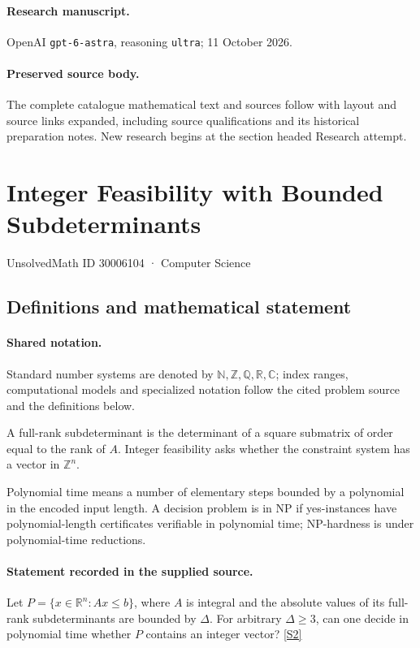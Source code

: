 \documentclass[11pt]{article}
\begin{document}
\paragraph{Research manuscript.} OpenAI \texttt{gpt-6-astra}, reasoning \texttt{ultra}; 11 October 2026.
\paragraph{Preserved source body.} The complete catalogue mathematical text and sources follow with layout and source links expanded, including source qualifications and its historical preparation notes. New research begins at the section headed Research attempt.

\section{Integer Feasibility with Bounded Subdeterminants}\label{30006104}
{\small UnsolvedMath ID 30006104 · Computer Science}
\subsection{Definitions and mathematical statement}

\paragraph{Shared notation.}Standard number systems are denoted by $\mathbb N,\mathbb Z,\mathbb Q,\mathbb R,\mathbb C$; index ranges, computational models and specialized notation follow the cited problem source and the definitions below.


A full-rank subdeterminant is the determinant of a square submatrix of order equal to the rank of $A$. Integer feasibility asks whether the constraint system has a vector in $\mathbb Z^n$.

Polynomial time means a number of elementary steps bounded by a polynomial in the encoded input length. A decision problem is in $\mathrm{NP}$ if yes-instances have polynomial-length certificates verifiable in polynomial time; NP-hardness is under polynomial-time reductions.
\paragraph{Statement recorded in the supplied source.}
Let $P=\{x\in\mathbb R^n:Ax\leq b\}$, where $A$ is integral and the absolute values of its full-rank subdeterminants are bounded by $\Delta$. For arbitrary $\Delta\geq3$, can one decide in polynomial time whether $P$ contains an integer vector? \href{https://doi.org/10.4171/owr/2024/50}{[S2]}
\end{document}
